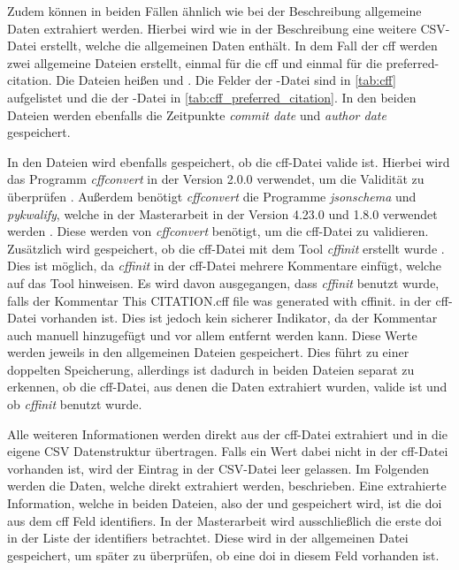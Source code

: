 Zudem können in beiden Fällen ähnlich wie bei der Beschreibung allgemeine Daten extrahiert werden.
Hierbei wird wie in der Beschreibung eine weitere CSV-Datei erstellt, welche die allgemeinen Daten enthält.
In dem Fall der \gls{cff} werden zwei allgemeine Dateien erstellt, einmal für die \gls{cff} und einmal für die \glqq preferred-citation\grqq{}.
Die Dateien heißen  und .
Die Felder der -Datei sind in \autoref{tab:cff} aufgelistet und die der -Datei in \autoref{tab:cff_preferred_citation}.
In den beiden Dateien werden ebenfalls die Zeitpunkte \emph{commit date} und \emph{author date} gespeichert.

In den Dateien wird ebenfalls gespeichert, ob die \gls{cff}-Datei valide ist.
Hierbei wird das Programm \emph{cffconvert} in der Version 2.0.0 verwendet, um die Validität zu überprüfen \autocite{spaaks_cffconvert_2021}.
Außerdem benötigt \emph{cffconvert} die Programme \emph{jsonschema} und \emph{pykwalify}, welche in der Masterarbeit in der Version 4.23.0 und 1.8.0 verwendet werden \autocites{noauthor_python-jsonschemajsonschema_2024}{grokzen_grokzenpykwalify_2024}.
Diese werden von \emph{cffconvert} benötigt, um die \gls{cff}-Datei zu validieren.
Zusätzlich wird gespeichert, ob die \gls{cff}-Datei mit dem Tool \emph{cffinit} erstellt wurde \autocite{spaaks_cffinit_2023}.
Dies ist möglich, da \emph{cffinit} in der \gls{cff}-Datei mehrere Kommentare einfügt, welche auf das Tool hinweisen.
Es wird davon ausgegangen, dass \emph{cffinit} benutzt wurde, falls der Kommentar \glqq This CITATION.cff file was generated with cffinit.\grqq{} in der \gls{cff}-Datei vorhanden ist.
Dies ist jedoch kein sicherer Indikator, da der Kommentar auch manuell hinzugefügt und vor allem entfernt werden kann.
Diese Werte werden jeweils in den allgemeinen Dateien gespeichert.
Dies führt zu einer doppelten Speicherung, allerdings ist dadurch in beiden Dateien separat zu erkennen, ob die \gls{cff}-Datei, aus denen die Daten extrahiert wurden, valide ist und ob \emph{cffinit} benutzt wurde.

Alle weiteren Informationen werden direkt aus der \gls{cff}-Datei extrahiert und in die eigene CSV Datenstruktur übertragen.
Falls ein Wert dabei nicht in der \gls{cff}-Datei vorhanden ist, wird der Eintrag in der CSV-Datei leer gelassen.
Im Folgenden werden die Daten, welche direkt extrahiert werden, beschrieben.
Eine extrahierte Information, welche in beiden Dateien, also der  und  gespeichert wird, ist die \gls{doi} aus dem \gls{cff} Feld \glqq identifiers\grqq{}.
In der Masterarbeit wird ausschließlich die erste \gls{doi} in der Liste der \glqq identifiers\grqq{} betrachtet.
Diese wird in der allgemeinen Datei gespeichert, um später zu überprüfen, ob eine \gls{doi} in diesem Feld vorhanden ist.

